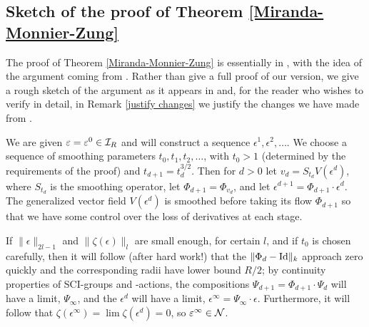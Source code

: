 \documentclass{article}
\begin{document}
\subsection{Sketch of the proof of Theorem \ref{Miranda-Monnier-Zung}}\label{sketch of MMZ proof}
The proof of Theorem \ref{Miranda-Monnier-Zung} is essentially in \cite[Appendix 1]{MirandaMonnierZung}, with the idea of the argument coming from \cite{Conn}.  Rather than give a full proof of our version, we give a rough sketch of the argument as it appears in \cite{MirandaMonnierZung} and, for the reader who wishes to verify in detail, in Remark \ref{justify changes} we justify the changes we have made from \cite{MirandaMonnierZung}.

We are given $\varepsilon=\varepsilon^0 \in \mathcal{I}_R$ and will construct a sequence $\epsilon^1,\epsilon^2,\ldots$.  We choose a sequence of smoothing parameters $t_0,t_1,t_2,\ldots$, with $t_0>1$ (determined by the requirements of the proof) and $t_{d+1}=t_d^{3/2}$.  Then for $d>0$ let $v_d = S_{t_d} V(\epsilon^d)$, where $S_{t_d}$ is the smoothing operator, let $\Phi_{d+1} = \Phi_{v_d}$, and let $\epsilon^{d+1}=\Phi_{d+1}\cdot \epsilon^d$.  The generalized vector field $V(\epsilon^d)$ is smoothed before taking its flow $\Phi_{d+1}$ so that we have some control over the loss of derivatives at each stage.

If $\|\epsilon\|_{2l-1}$ and $\|\zeta(\epsilon)\|_l$ are small enough, for certain $l$, and if $t_0$ is chosen carefully, then it will follow (after hard work!) that the $\|\Phi_d-\textrm{Id}\|_k$ approach zero quickly and the corresponding radii have lower bound $R/2$; by continuity properties of SCI-groups and -actions, the compositions ${\Psi_{d+1} = \Phi_{d+1}\cdot\Psi_d}$ will have a limit, $\Psi_\infty$, and the $\epsilon^d$ will have a limit, ${\epsilon^\infty = \Psi_\infty\cdot \epsilon}$.  Furthermore, it will follow that ${\zeta(\epsilon^\infty) = \lim\zeta(\epsilon^d) = 0}$, so $\varepsilon^\infty\in\mathcal{N}$.
\end{document}
